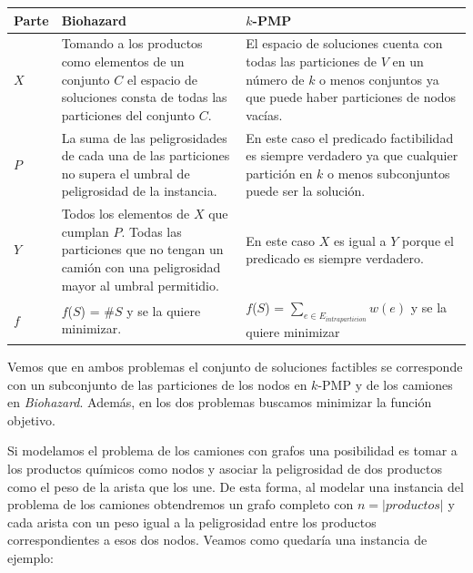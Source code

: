 \begin{center}
  \begin{tabular}{ >{\centering}m{1cm}<{\centering} | m{7cm} | m{7cm} }
      \centering Parte & \centering Biohazard & \centering $k$-PMP \tabularnewline \hline
      $X$ & 
      Tomando a los productos como elementos de un conjunto $C$ el espacio de soluciones consta de todas
      las particiones del conjunto $C$. & 
      El espacio de soluciones cuenta con todas las particiones de $V$ en un
      número de $k$ o menos conjuntos ya que puede haber particiones de nodos vacías.\tabularnewline \hline
      $P$ & La suma de las peligrosidades de cada una de las particiones no supera el umbral de peligrosidad de la instancia. & 
      En este caso el predicado factibilidad es siempre verdadero ya que cualquier partición en $k$ o menos subconjuntos
      puede ser la solución. \tabularnewline \hline
      $Y$ & Todos los elementos de $X$ que cumplan $P$. Todas las particiones que no tengan un camión con una peligrosidad mayor al umbral permitidio. & 
      En este caso $X$ es igual a $Y$ porque el predicado es siempre verdadero. \tabularnewline \hline
      $f$ & $f$($S$) = \#$S$ y se la quiere minimizar. & $f$($S$) = $\sum_{e \in E_{intraparticion}} w(e)$ y se la quiere minimizar \tabularnewline 
    \end{tabular}
\end{center}

Vemos que en ambos problemas el conjunto de soluciones factibles se corresponde con un subconjunto de las particiones de los nodos en
$k$-PMP y de los camiones en \emph{Biohazard}. Además, en los dos problemas buscamos minimizar la función objetivo.

Si modelamos el problema de los camiones con grafos una posibilidad es tomar a los productos químicos como nodos y asociar la peligrosidad
de dos productos como el peso de la arista que los une. De esta forma, al modelar una instancia del problema de los camiones obtendremos 
un grafo completo con $n = \left\vert{productos}\right\vert$ y cada arista con un peso igual a la peligrosidad entre los productos 
correspondientes a esos dos nodos. Veamos como quedaría una instancia de ejemplo:

